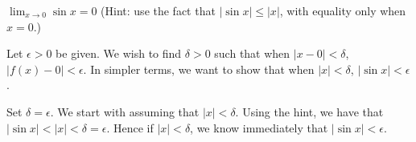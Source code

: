 {$\displaystyle \lim_{x\to 0} \sin x= 0$ (Hint: use the fact that $|\sin x| \leq |x|$, with equality only when $x=0$.)}
{Let $\epsilon >0$ be given. We wish to find $\delta >0$ such that when $|x-0|<\delta$, $|f(x)-0|<\epsilon$. In simpler terms, we want to show that when $|x|<\delta$, $|\sin x| < \epsilon$. 

Set $\delta = \epsilon$. We start with assuming that $|x|<\delta$. Using the hint, we have that $|\sin x | < |x| < \delta = \epsilon$. Hence if $|x|<\delta$, we know immediately that $|\sin x| < \epsilon$.
}






